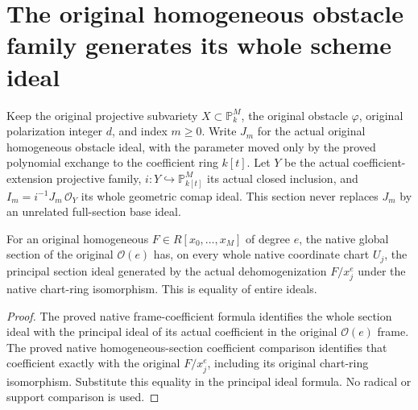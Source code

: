 \section{The original homogeneous obstacle family generates its whole scheme ideal}
\label{sec:c0n-original-generation}

Keep the original projective subvariety $X\subset\mathbb P^M_k$, the
original obstacle $\varphi$, original polarization integer $d$, and index
$m\geq0$.  Write $J_m$ for the actual original homogeneous obstacle ideal,
with the parameter moved only by the proved polynomial exchange to the
coefficient ring $k[t]$.  Let $Y$ be the actual coefficient-extension
projective family, $i:Y\hookrightarrow\mathbb P^M_{k[t]}$ its actual closed
inclusion, and $I_m=i^{-1}J_m\,\mathcal O_Y$ its whole geometric comap ideal.
This section never replaces $J_m$ by an unrelated full-section base ideal.

\begin{lemma}
\label{lem:c0n-original-homogeneous-section-ideal}
\leanok
For an original homogeneous $F\in R[x_0,\ldots,x_M]$ of degree $e$,
the native global section of the original $\mathcal O(e)$ has, on every
whole native coordinate chart $U_j$, the principal section ideal generated
by the actual dehomogenization $F/x_j^e$ under the native chart-ring
isomorphism.  This is equality of entire ideals.
\end{lemma}
\begin{proof}
The proved native frame-coefficient formula identifies the whole section
ideal with the principal ideal of its actual coefficient in the original
$\mathcal O(e)$ frame.  The proved native homogeneous-section coefficient
comparison identifies that coefficient exactly with the original
$F/x_j^e$, including its original chart-ring isomorphism.  Substitute
this equality in the principal ideal formula.  No radical or support
comparison is used.
\end{proof}

